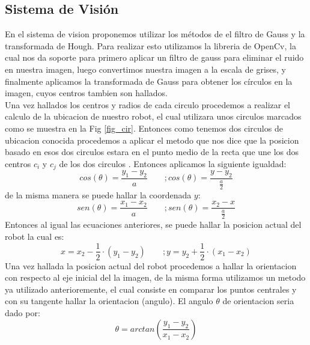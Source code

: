 \documentclass[conference]{IEEEtran}
\begin{document}
\subsection{Sistema de Visi\'on}
En el sistema de vision proponemos utilizar los m\'etodos de el filtro de Gauss y la transformada de Hough. Para realizar esto utilizamos la libreria de OpenCv, la cual nos da soporte para primero aplicar un filtro de gauss para eliminar el ruido en nuestra imagen, luego convertimos nuestra imagen a la escala de grises, y finalmente aplicamos la transformada de Gauss para obtener los c\'irculos en la imagen, cuyos centros tambien son hallados.\\
Una vez hallados los centros y radios de cada circulo procedemos a realizar el calculo de la ubicacion de nuestro robot, el cual utilizara unos circulos marcados como se muestra en la Fig  \ref{fig_cir}. Entonces como tenemos dos circulos de ubicacion conocida procedemos a aplicar el metodo  que nos dice que la posicion basado en esos dos circulos estara en el punto medio de la recta que une los dos centros  $c_i$ y $c_j$ de los dos circulos \cite{kelson_glo}. Entonces aplicamos la siguiente igualdad:
\begin{equation}
cos(\theta)=\frac{y_1-y_2}{a} \qquad; cos(\theta)=\frac{y-y_2}{\frac{a}{2}}
\end{equation}
de la misma manera se puede hallar la coordenada $y$:
\begin{equation}
sen(\theta)=\frac{x_1-x_2}{a} \qquad; sen(\theta)=\frac{x_2-x}{\frac{a}{2}}
\end{equation}
Entonces al igual las ecuaciones anteriores, se puede hallar la posicion actual del robot la cual es:
\begin{equation}
x=x_2-\frac{1}{2}\cdot ({y_1-y_2} )\qquad ; y=y_2+ \frac{1}{2}\cdot( {x_1-x_2})
\end{equation}
Una vez hallada la posicion actual del robot procedemos a hallar la orientacion con respecto al eje inicial del la imagen, de la misma forma utilizamos un metodo ya utilizado anterioremente,  el cual consiste en comparar los puntos centrales y con su tangente hallar la orientacion (angulo)\cite{kelson_glo}. El angulo $\theta$ de orientacion seria dado por:
\begin{equation}
\theta=arctan(\frac{y_1-y_2}{x_1-x_2} )
\end{equation}
\end{document}

